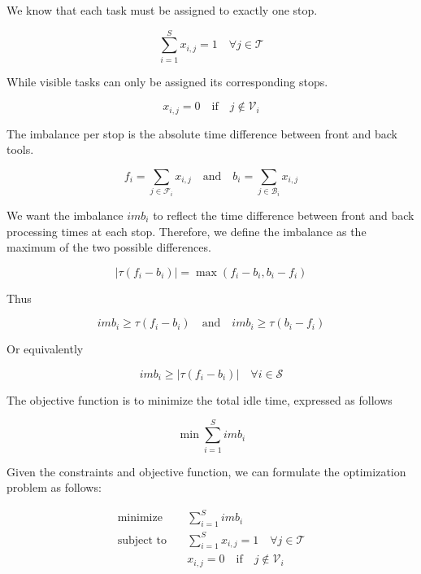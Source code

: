 We know that each task must be assigned to exactly one stop.

\begin{equation}
    \sum_{i=1}^{S} x_{i,j} = 1 \quad \forall j \in \mathcal{T}
\end{equation}

While visible tasks can only be assigned its corresponding stops.

\begin{equation}
    x_{i,j} = 0 \quad \text{if} \quad j \notin \mathcal{V}_i
\end{equation}

The imbalance per stop is the absolute time difference between front and back tools.

\begin{equation}
    f_i = \sum_{j \in \mathcal{F}_i} x_{i,j} \quad \text{and} \quad b_i = \sum_{j \in \mathcal{B}_i} x_{i,j}
\end{equation}

We want the imbalance ${imb}_i$ to reflect the time difference between front and back processing times at each stop. Therefore, we define the imbalance as the maximum of the two possible differences.

\begin{equation}
    \left| \tau (f_i - b_i) \right| = \max \left( f_i - b_i, b_i - f_i \right)
\end{equation}

Thus

\begin{equation}
    {imb}_i \geq \tau \left(f_i - b_i\right) \quad \text{and} \quad {imb}_i \geq \tau \left(b_i - f_i\right)
\end{equation}

Or equivalently

\begin{equation}
    {imb}_i \geq \left| \tau (f_i - b_i) \right| \quad \forall i \in \mathcal{S}
\end{equation}

The objective function is to minimize the total idle time, expressed as follows

\begin{equation}
    \min \sum_{i=1}^{S} {imb}_i
\end{equation}

Given the constraints and objective function, we can formulate the optimization problem as follows:

\begin{equation}
    \begin{aligned}
        \text{minimize}   & \quad \sum_{i=1}^{S} {imb}_i                                     \\
        \text{subject to} & \quad \sum_{i=1}^{S} x_{i,j} = 1 \quad \forall j \in \mathcal{T} \\
                          & \quad x_{i,j} = 0 \quad \text{if} \quad j \notin \mathcal{V}_i
    \end{aligned}
\end{equation}

